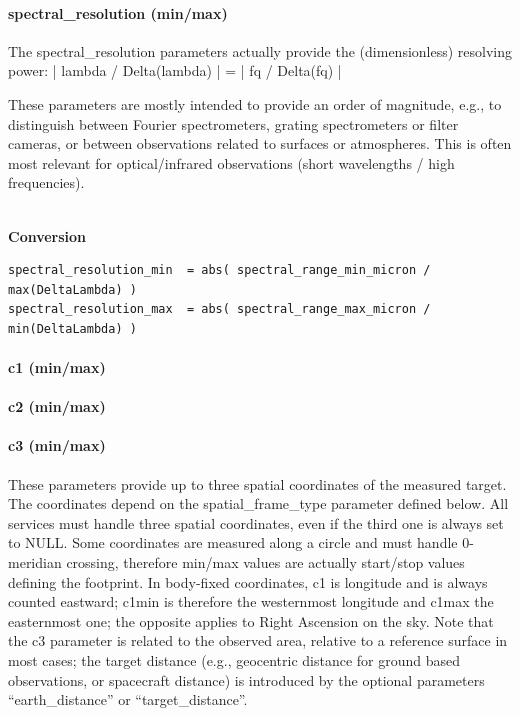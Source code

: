 \documentclass[11pt,a4paper]{ivoa}
\begin{document}
\paragraph{spectral\_resolution (min/max)}

The spectral\_resolution parameters actually provide the (dimensionless)
resolving power: | lambda / Delta(lambda) | = | fq / Delta(fq) |

These parameters are mostly intended to provide an order of magnitude,
e.g., to distinguish between Fourier spectrometers, grating spectrometers
or filter cameras, or between observations related to surfaces or
atmospheres. This is often most relevant for optical/infrared observations
(short wavelengths / high frequencies).

\textbf{\\}
\textbf{Conversion}

\begin{verbatim}
spectral_resolution_min  = abs( spectral_range_min_micron / max(DeltaLambda) )
spectral_resolution_max  = abs( spectral_range_max_micron / min(DeltaLambda) )
\end{verbatim}

\paragraph{c1 (min/max)}

\paragraph{c2 (min/max)}

\paragraph{c3 (min/max)}

These parameters provide up to three spatial coordinates of the measured
target. The coordinates depend on the spatial\_frame\_type parameter
defined below. All services must handle three spatial coordinates,
even if the third one is always set to NULL. Some coordinates are
measured along a circle and must handle 0-meridian crossing, therefore
min/max values are actually start/stop values defining the footprint. In
body-fixed coordinates, c1 is longitude and is always counted eastward;
c1min is therefore the westernmost longitude and c1max the easternmost
one; the opposite applies to Right Ascension on the sky. Note that the
c3 parameter is related to the observed area, relative to a reference
surface in most cases; the target distance (e.g., geocentric distance
for ground based observations, or spacecraft distance) is introduced by
the optional parameters  ``earth\_distance'' or ``target\_distance''.
\end{document}
